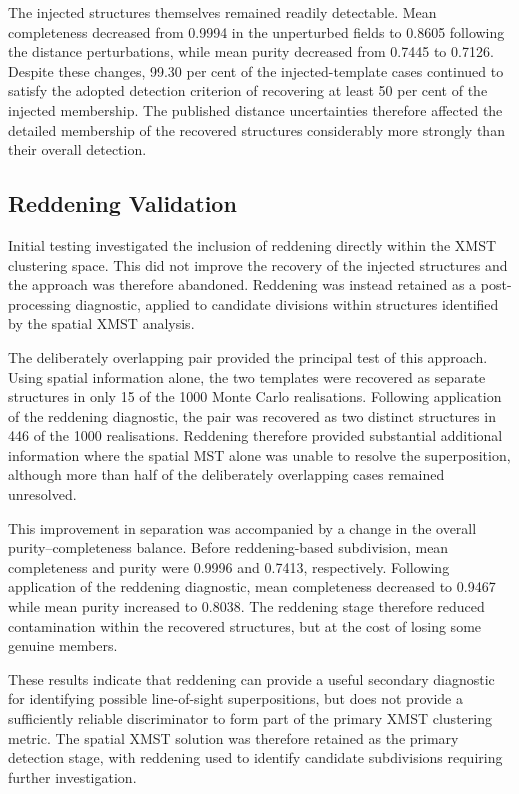 \documentclass[fleqn,usenatbib]{mnras}
\begin{document}
The injected structures themselves remained readily detectable. Mean completeness decreased from 0.9994 in the unperturbed fields to 0.8605 following the distance perturbations, while mean purity decreased from 0.7445 to 0.7126. Despite these changes, 99.30 per cent of the injected-template cases continued to satisfy the adopted detection criterion of recovering at least 50 per cent of the injected membership. The published distance uncertainties therefore affected the detailed membership of the recovered structures considerably more strongly than their overall detection.

\subsection{Reddening Validation}
Initial testing investigated the inclusion of reddening directly within the XMST clustering space. This did not improve the recovery of the injected structures and the approach was therefore abandoned. Reddening was instead retained as a post-processing diagnostic, applied to candidate divisions within structures identified by the spatial XMST analysis.

The deliberately overlapping pair provided the principal test of this approach. Using spatial information alone, the two templates were recovered as separate structures in only 15 of the 1000 Monte Carlo realisations. Following application of the reddening diagnostic, the pair was recovered as two distinct structures in 446 of the 1000 realisations. Reddening therefore provided substantial additional information where the spatial MST alone was unable to resolve the superposition, although more than half of the deliberately overlapping cases remained unresolved. 

This improvement in separation was accompanied by a change in the overall purity–completeness balance. Before reddening-based subdivision, mean completeness and purity were 0.9996 and 0.7413, respectively. Following application of the reddening diagnostic, mean completeness decreased to 0.9467 while mean purity increased to 0.8038. The reddening stage therefore reduced contamination within the recovered structures, but at the cost of losing some genuine members. 

These results indicate that reddening can provide a useful secondary diagnostic for identifying possible line-of-sight superpositions, but does not provide a sufficiently reliable discriminator to form part of the primary XMST clustering metric. The spatial XMST solution was therefore retained as the primary detection stage, with reddening used to identify candidate subdivisions requiring further investigation.
\end{document}

